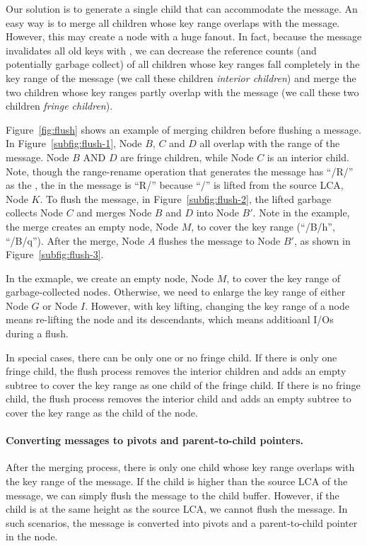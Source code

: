 Our solution is to generate a single child that can accommodate the \goto
message.
An easy way is to merge all children whose key range overlaps with the
\goto message.
However, this may create a node with a huge fanout.
In fact, because the \goto message invalidates all old keys
with \dpre, we can decrease the reference counts
(and potentially garbage collect)
of all children whose key ranges fall completely in the key range of the \goto
message (we call these children \textit{interior children})
and merge the two children whose key ranges partly overlap with the
\goto message (we call these two children \textit{fringe children}).

Figure~\ref{fig:flush} shows an example of merging children before flushing a
\goto message.
In Figure~\ref{subfig:flush-1}, Node $B$, $C$ and $D$ all overlap with the
range of the \goto message.
Node $B$ AND $D$ are fringe children, while Node $C$ is an interior child.
Note, though the range-rename operation that generates the \goto message has
``/R/'' as the \spre, the \spre in the \goto message is ``R/'' because ``/'' is
lifted from the source LCA, Node $K$.
To flush the \goto message, in Figure~\ref{subfig:flush-2}, the lifted \bedag
garbage collects Node $C$ and merges Node $B$ and $D$ into Node $B'$.
Note in the example, the merge creates an empty node, Node $M$, to cover the key
range (``/B/h'', ``/B/q'').
After the merge, Node $A$ flushes the \goto message to Node $B'$, as shown in
Figure~\ref{subfig:flush-3}.

In the exmaple, we create an empty node, Node $M$, to cover the key range of
garbage-collected nodes.
Otherwise, we need to enlarge the key range of either Node $G$ or Node $I$.
However, with key lifting, changing the key range of a node means re-lifting
the node and its descendants, which means additioanl I/Os during a flush.

In special cases, there can be only one or no fringe child.
If there is only one fringe child, the flush process removes the interior
children and adds an empty subtree to cover the key range as one child of the
fringe child.
If there is no fringe child, the flush process removes the interior child and
adds an empty subtree to cover the key range as the child of the node.

\paragraph{Converting \goto messages to pivots and parent-to-child pointers.}
After the merging process, there is only one child whose key range overlaps
with the key range of the \goto message.
If the child is higher than the source LCA of the \goto message,
we can simply flush the \goto message to the child buffer.
However, if the child is at the same height as the source LCA,
we cannot flush the \goto message.
In such scenarios, the \goto message is converted into pivots and a
parent-to-child pointer in the node.

